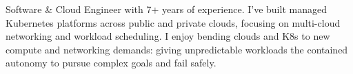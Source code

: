 
\begin{cvparagraph}
Software \& Cloud Engineer with 7+ years of experience. I've built managed Kubernetes platforms across public and private clouds, focusing on multi-cloud networking and workload scheduling. I enjoy bending clouds and K8s to new compute and networking demands: giving unpredictable workloads the contained autonomy to pursue complex goals and fail safely.
\end{cvparagraph}
